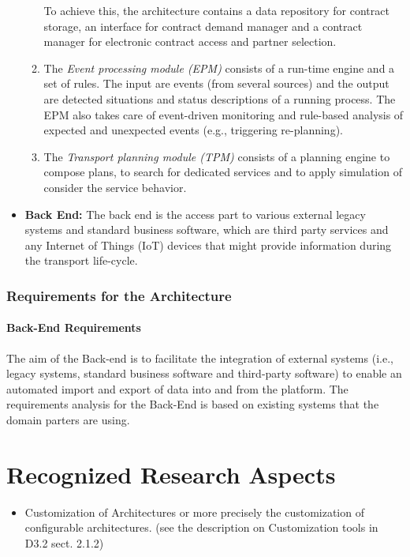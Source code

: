 \begin{itemize}
\begin{enumerate}
										To achieve this, the architecture contains a data repository for contract storage,
										   an interface for contract demand manager and a contract manager for electronic contract
											access and partner selection.
					\item The \emph{Event processing module (EPM)} 		consists of a run-time engine and a set of rules.
					The input are events (from several sources) and the output are detected situations and status descriptions
					 of a running process. The EPM also takes care of event-driven monitoring and rule-based
					 analysis of expected and unexpected events (e.g., triggering re-planning).
					\item The \emph{Transport planning module (TPM)} consists of a planning engine to compose plans,
					                   to search for dedicated services and to apply simulation of consider the service behavior.
				\end{enumerate}
 \item \textbf{Back End:} The back end is the access part to various external
    legacy systems and standard business software, which are third party services and any
Internet of Things (IoT) devices that might provide information during the transport life-cycle.
\end{itemize}


\subsubsection{Requirements for the Architecture}


\paragraph{Back-End Requirements}

The aim of the Back-end is to facilitate the integration of external systems (i.e., legacy systems,
standard business software and third-party software) to enable an automated
import and export of data into and from the platform.
The requirements analysis for the Back-End is based on existing
systems that the domain parters are using.



\section{Recognized Research Aspects}

\begin{itemize}
	\item Customization of Architectures or more precisely the
	   customization of configurable architectures.
		 (see the description on Customization tools in D3.2 sect. 2.1.2)
\end{itemize}